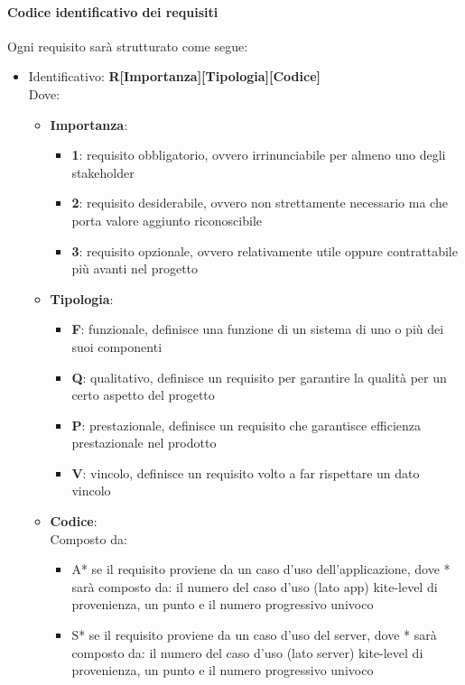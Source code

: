 \paragraph{Codice identificativo dei requisiti}
Ogni requisito sarà strutturato come segue:
\begin{itemize}
	\item Identificativo: \textbf{R[Importanza][Tipologia][Codice]}\\
Dove:
\begin{itemize}
		\item \textbf{Importanza}:
		\begin{itemize}
			\item \textbf{1}: requisito obbligatorio, ovvero irrinunciabile per almeno uno degli stakeholder
			\item \textbf{2}: requisito desiderabile, ovvero non strettamente necessario ma che porta valore aggiunto riconoscibile
			\item \textbf{3}: requisito opzionale, ovvero relativamente utile oppure contrattabile più avanti nel progetto
		\end{itemize}
		\item \textbf{Tipologia}:
		\begin{itemize}
			\item \textbf{F}: funzionale, definisce una funzione di un sistema di uno o più dei suoi componenti
			\item \textbf{Q}: qualitativo, definisce un requisito per garantire la qualità per un certo aspetto del progetto
			\item \textbf{P}: prestazionale, definisce un requisito che garantisce efficienza prestazionale nel prodotto
			\item \textbf{V}: vincolo, definisce un requisito volto a far rispettare un dato vincolo
		\end{itemize}
		\item \textbf{Codice}:\\
		Composto da:
		\begin{itemize}
			\item A* se il requisito proviene da un caso d'uso dell'applicazione, dove * sarà composto da: il numero del caso d'uso (lato app) kite-level di provenienza, un punto e il numero progressivo univoco
			\item S* se il requisito proviene da un caso d'uso del server, dove * sarà composto da: il numero del caso d'uso (lato server) kite-level di provenienza, un punto e il numero progressivo univoco

\end{itemize}
\end{itemize}
\end{itemize}
